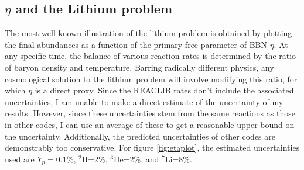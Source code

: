 \subsection[eta and the Lithium problem]{$\eta$ and the Lithium problem}
The most well-known illustration of the lithium problem is obtained by plotting the final abundances as a function of the primary free parameter of BBN $\eta$. At any specific time, the balance of various reaction rates is determined by the ratio of baryon density and temperature. Barring radically different physics, any cosmological solution to the lithium problem will involve modifying this ratio, for which $\eta$ is a direct proxy. Since the REACLIB rates don't include the associated uncertainties, I am unable to make a direct estimate of the uncertainty of my results. However, since these uncertainties stem from the same reactions as those in other codes, I can use an average of these to get a reasonable upper bound on the uncertainty. Additionally, the predicted uncertainties of other codes are demonstrably too conservative. For figure \ref{fig:etaplot}, the estimated uncertainties used are $ Y_p=0.1\%$, $^{2}$H=2\%, $^{3}$He=2\%, and $^{7}$Li=8\%.

